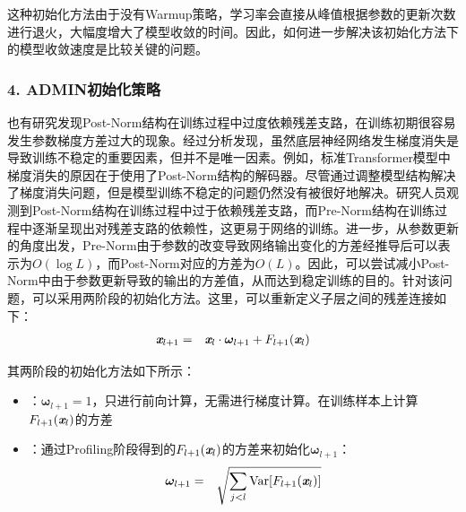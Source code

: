 \parinterval 这种初始化方法由于没有Warmup策略，学习率会直接从峰值根据参数的更新次数进行退火，大幅度增大了模型收敛的时间。因此，如何进一步解决该初始化方法下的模型收敛速度是比较关键的问题。


\subsubsection{4. ADMIN初始化策略}

\parinterval 也有研究发现Post-Norm结构在训练过程中过度依赖残差支路，在训练初期很容易发生参数梯度方差过大的现象。经过分析发现，虽然底层神经网络发生梯度消失是导致训练不稳定的重要因素，但并不是唯一因素。例如，标准Transformer模型中梯度消失的原因在于使用了Post-Norm结构的解码器。尽管通过调整模型结构解决了梯度消失问题，但是模型训练不稳定的问题仍然没有被很好地解决。研究人员观测到Post-Norm结构在训练过程中过于依赖残差支路，而Pre-Norm结构在训练过程中逐渐呈现出对残差支路的依赖性，这更易于网络的训练。进一步，从参数更新的角度出发，Pre-Norm由于参数的改变导致网络输出变化的方差经推导后可以表示为$O(\log L)$，而Post-Norm对应的方差为$O(L)$。因此，可以尝试减小Post-Norm中由于参数更新导致的输出的方差值，从而达到稳定训练的目的。针对该问题，可以采用两阶段的初始化方法。这里，可以重新定义子层之间的残差连接如下：
\begin{eqnarray}
\textbf{\em x}_{l+1} &=& \textbf{\em x}_l \cdot {\bm  \omega_{l+1}} + F_{l+1}(\textbf{\em x}_l)
\label{eq:15-47}
\end{eqnarray}

\noindent 其两阶段的初始化方法如下所示：

\begin{itemize}
\vspace{0.5em}
\item {\small{}}：${\bm  \omega_{l+1}} = 1$，只进行前向计算，无需进行梯度计算。在训练样本上计算$F_{l+1}(\textbf{\em x}_l)$的方差
\vspace{0.5em}
\item {\small{}}：通过Profiling阶段得到的$F_{l+1}(\textbf{\em x}_l)$的方差来初始化$\bm  \omega_{l+1}$：
\begin{eqnarray}
{\bm \omega_{l+1}} &=& \sqrt{\sum_{j<l}\textrm{Var}[F_{l+1}(\textbf{\em x}_l)]}
\label{eq:15-48}
\end{eqnarray}
\end{itemize}

